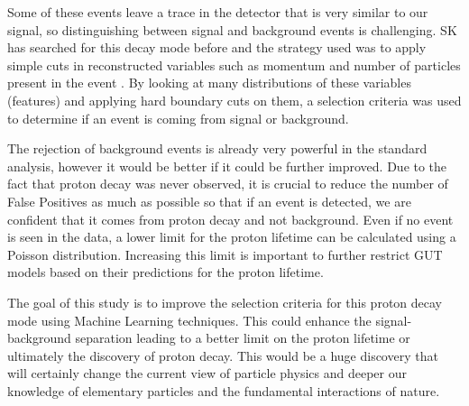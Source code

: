 Some of these events leave a trace in the detector that is very similar to our signal, so distinguishing between signal and background events is challenging. SK has searched for this decay mode before and the strategy used was to apply simple cuts in reconstructed variables such as momentum and number of particles present in the event \cite{Miura}. By looking at many distributions of these variables (features) and applying hard boundary cuts on them, a selection criteria was used to determine if an event is coming from signal or background.

The rejection of background events is already very powerful in the standard analysis, however it would be better if it could be further improved. Due to the fact that proton decay was never observed, it is crucial to reduce the number of False Positives as much as possible so that if an event is detected, we are confident that it comes from proton decay and not background. Even if no event is seen in the data, a lower limit for the proton lifetime can be calculated using a Poisson distribution. Increasing this limit is important to further restrict GUT models based on their predictions for the proton lifetime.

The goal of this study is to improve the selection criteria for this proton decay mode using Machine Learning techniques. This could enhance the signal-background separation leading to a better limit on the proton lifetime or ultimately the discovery of proton decay. This would be a huge discovery that will certainly change the current view of particle physics and deeper our knowledge of elementary particles and the fundamental interactions of nature. 
